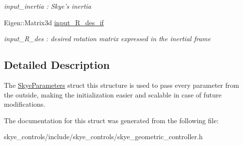 \begin{DoxyCompactItemize}
\begin{DoxyCompactList}\small\item\em input\-\_\-inertia \-: Skye's inertia \end{DoxyCompactList}\item 
\hypertarget{struct_skye_parameters_acc2c9df1cdc2feb5695ae3dc49c7b838}{Eigen\-::\-Matrix3d \hyperlink{struct_skye_parameters_acc2c9df1cdc2feb5695ae3dc49c7b838}{input\-\_\-\-R\-\_\-des\-\_\-if}}\label{struct_skye_parameters_acc2c9df1cdc2feb5695ae3dc49c7b838}

\begin{DoxyCompactList}\small\item\em input\-\_\-\-R\-\_\-des \-: desired rotation matrix expressed in the inertial frame \end{DoxyCompactList}\end{DoxyCompactItemize}


\subsection{Detailed Description}
The \hyperlink{struct_skye_parameters}{Skye\-Parameters} struct this structure is used to pass every parameter from the outside, making the initialization easier and scalable in case of future modifications. 

The documentation for this struct was generated from the following file\-:\begin{DoxyCompactItemize}
\item 
skye\-\_\-controls/include/skye\-\_\-controls/skye\-\_\-geometric\-\_\-controller.\-h\end{DoxyCompactItemize}
